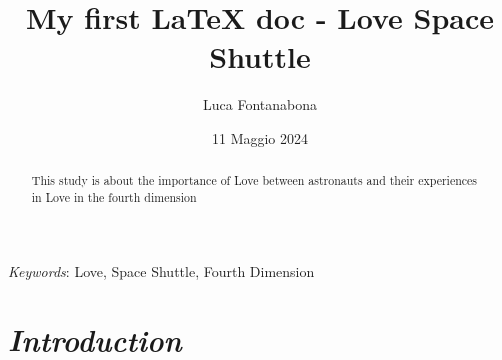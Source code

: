 \documentclass[12pt]{article} %
\begin{document}

\title{My first LaTeX doc - Love Space Shuttle}
\author{Luca Fontanabona}
\date{11 Maggio 2024} %

\maketitle %
\tableofcontents %


\begin{abstract} %
This study is about the importance of Love between astronauts and their experiences in Love in the fourth dimension
\end{abstract}

\bigskip %

\textit{Keywords}: Love, Space Shuttle, Fourth Dimension %

\section{\textit{Introduction}} %

\label{sec:intro} %
\end{document}
